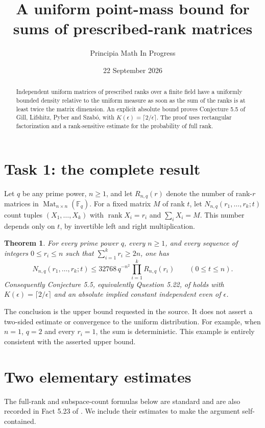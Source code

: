 \documentclass[11pt]{article}
\title{A uniform point-mass bound for sums of prescribed-rank matrices}
\author{Principia Math In Progress}
\date{22 September 2026}
\newtheorem{theorem}{Theorem}
\newcommand{\Mat}{\operatorname{Mat}}
\newcommand{\rank}{\operatorname{rank}}
\begin{document}
\maketitle
\begin{abstract}
Independent uniform matrices of prescribed ranks over a finite field
have a uniformly bounded density relative to the uniform measure as soon
as the sum of the ranks is at least twice the matrix dimension.
An explicit absolute bound proves Conjecture 5.5 of Gill, Lifshitz,
Pyber and Szab\'o, with $K(\epsilon)=\lceil2/\epsilon\rceil$.
The proof uses rectangular factorization and a rank-sensitive estimate
for the probability of full rank.
\end{abstract}

\section*{Task 1: the complete result}
Let $q$ be any prime power, $n\ge1$, and let $R_{n,q}(r)$ denote the
number of rank-$r$ matrices in $\Mat_{n\times n}(\mathbb F_q)$.
For a fixed matrix $M$ of rank $t$, let
$N_{n,q}(r_1,\ldots,r_k;t)$ count tuples $(X_1,\ldots,X_k)$ with
$\rank X_i=r_i$ and $\sum_iX_i=M$.
This number depends only on $t$, by invertible left and right multiplication.

\begin{theorem}\label{main}
For every prime power $q$, every $n\ge1$, and every sequence of integers
$0\le r_i\le n$ such that $\sum_{i=1}^k r_i\ge2n$, one has
\[
 N_{n,q}(r_1,\ldots,r_k;t)
 \le 32768\,q^{-n^2}\prod_{i=1}^k R_{n,q}(r_i)
 \qquad(0\le t\le n).
\]
Consequently Conjecture 5.5, equivalently Question 5.22, of
\cite{source} holds with $K(\epsilon)=\lceil2/\epsilon\rceil$ and an
absolute implied constant independent even of $\epsilon$.
\end{theorem}

The conclusion is the upper bound requested in the source. It does not
assert a two-sided estimate or convergence to the uniform distribution.
For example, when $n=1$, $q=2$ and every $r_i=1$, the sum is deterministic.
This example is entirely consistent with the asserted upper bound.

\section*{Two elementary estimates}
The full-rank and subspace-count formulas below are standard and are
also recorded in Fact 5.23 of \cite{source}. We include their estimates
to make the argument self-contained.
\end{document}

